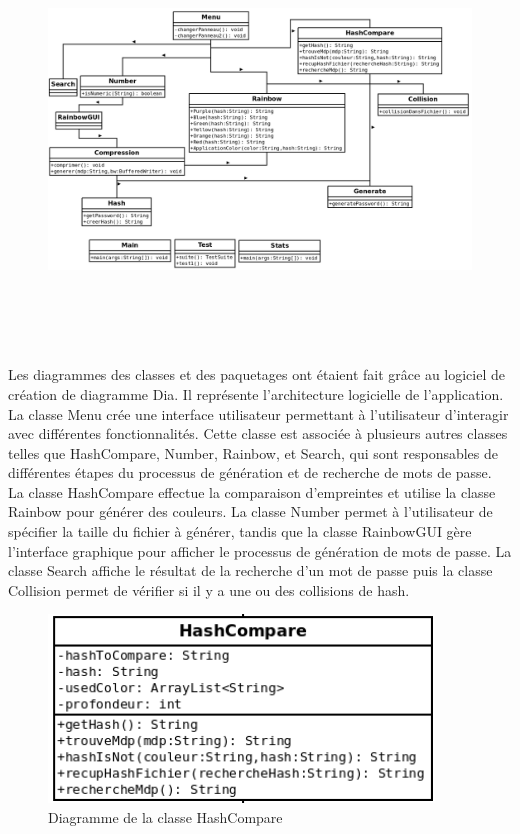 \documentclass[a4paper,12pt]{article}
\begin{document}
\begin{figure}[H]
\centering
\includegraphics[height=11cm]{img/diagramme_classe.png}
\end{figure}
Les diagrammes des classes et des paquetages ont étaient fait grâce au logiciel de création de diagramme Dia. Il représente l'architecture logicielle de l'application. La classe Menu crée une interface utilisateur permettant à l'utilisateur d'interagir avec différentes fonctionnalités. Cette classe est associée à plusieurs autres classes telles que HashCompare, Number, Rainbow, et Search, qui sont responsables de différentes étapes du processus de génération et de recherche de mots de passe. La classe HashCompare effectue la comparaison d'empreintes et utilise la classe Rainbow pour générer des couleurs. La classe Number permet à l'utilisateur de spécifier la taille du fichier à générer, tandis que la classe RainbowGUI gère l'interface graphique pour afficher le processus de génération de mots de passe. La classe Search affiche le résultat de la recherche d'un mot de passe puis la classe Collision permet de vérifier si il y a une ou des collisions de hash.

\begin{figure}[H]
\centering
\includegraphics[height=5cm]{img/classe_hashcompare.png}
\caption{Diagramme de la classe HashCompare}
\end{figure}
\end{document}
